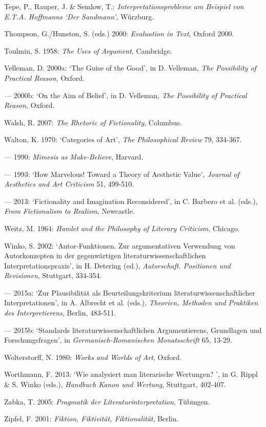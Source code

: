 \begin{hangparas}{.5cm}{1}
Tepe, P., Rauper, J. \& Semlow, T.: \emph{Interpretationsprobleme am Beispiel von E.T.A. Hoffmanns `Der Sandmann',} W\"urzburg.

Thompson, G./Hunston, S. (eds.) 2000: \emph{Evaluation in Text}, Oxford 2000.

Toulmin, S. 1958: \emph{The Uses of Argument}, Cambridge.

Velleman, D. 2000a: `The Guise of the Good', in D. Velleman, \emph{The Possibility of Practical Reason}, Oxford.

--- 2000b: `On the Aim of Belief', in D. Velleman, \emph{The Possibility of Practical Reason}, Oxford.

Walsh, R. 2007: \emph{The Rhetoric of Fictionality}, Columbus.

Walton, K. 1970: `Categories of Art', \emph{The Philosophical Review} 79, 334-367.

--- 1990: \emph{Mimesis as Make-Believe}, Harvard.

--- 1993: `How Marvelous! Toward a Theory of Aesthetic Value', \emph{Journal of Aesthetics and Art Criticism} 51, 499-510.

--- 2013: `Fictionality and Imagination Reconsidered', in C. Barbero et al. (eds.), \emph{From Fictionalism to Realism}, Newcastle.

Weitz, M. 1964: \emph{Hamlet and the Philosophy of Literary Criticism}, Chicago.

Winko, S. 2002: `Autor-Funktionen. Zur argumentativen Verwendung von Autorkonzepten in der gegenw\"artigen literaturwissenschaftlichen Interpretationspraxis', in H. Detering (ed.), \emph{Autorschaft. Positionen und Revisionen}, Stuttgart, 334-354.

--- 2015a: `Zur Plausibilit\"at als Beurteilungskriterium literaturwissenschaftlicher Interpretationen', in A. Albrecht et al. (eds.), \emph{Theorien, Methoden und Praktiken des Interpretierens}, Berlin, 483-511.

--- 2015b: `Standards literaturwissenschaftlichen Argumentierens, Grundlagen und Forschungsfragen', in \emph{Germanisch-Romanischen Monatsschrift} 65, 13-29.

Wolterstorff, N. 1980: \emph{Works and Worlds of Art}, Oxford.

Worthmann, F. 2013: `Wie analysiert man literarische Wertungen? ', in G. Rippl \& S. Winko (eds.), \emph{Handbuch Kanon und Wertung}, Stuttgart, 402-407.

Zabka, T. 2005: \emph{Pragmatik der Literaturinterpretation}, T\"ubingen.

Zipfel, F. 2001: \emph{Fiktion, Fiktivit\"at, Fiktionalit\"at}, Berlin.

\end{hangparas}
